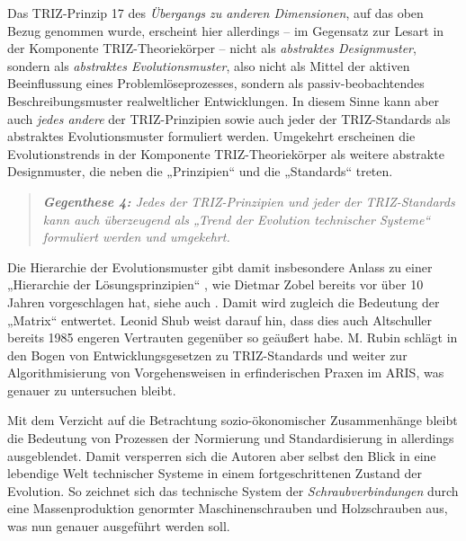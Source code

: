 \documentclass[11pt,a4paper]{article}
\begin{document}
Das TRIZ-Prinzip 17 des \emph{Übergangs zu anderen Dimensionen}, auf das oben
Bezug genommen wurde, erscheint hier allerdings -- im Gegensatz zur Lesart in
der Komponente TRIZ-Theoriekörper -- nicht als \emph{abstraktes Designmuster},
sondern als \emph{abstraktes Evolutionsmuster}, also nicht als Mittel der
aktiven Beeinflussung eines Problemlöseprozesses, sondern als
passiv-beobachtendes Beschreibungsmuster realweltlicher Entwicklungen.  In
diesem Sinne kann aber auch \emph{jedes andere} der TRIZ-Prinzipien sowie auch
jeder der TRIZ-Standards als abstraktes Evolutionsmuster formuliert
werden. Umgekehrt erscheinen die Evolutionstrends in der Komponente
TRIZ-Theoriekörper als weitere abstrakte Designmuster, die neben die
„Prinzipien“ und die „Standards“ treten.
\begin{quote}\it
  \textbf{Gegenthese 4:} Jedes der TRIZ-Prinzipien und jeder der
  TRIZ-Standards kann auch überzeugend als „Trend der Evolution technischer
  Systeme“ formuliert werden und umgekehrt. 
\end{quote}
Die Hierarchie der Evolutionsmuster gibt damit insbesondere Anlass zu einer
„Hierarchie der Lösungsprinzipien“ \cite[Kap. 3]{Zobel2016}, wie Dietmar Zobel
bereits vor über 10 Jahren vorgeschlagen hat, siehe auch \cite{Zobel2020}.
Damit wird zugleich die Bedeutung der „Matrix“ entwertet. Leonid Shub
\cite{Shub2006} weist darauf hin, dass dies auch Altschuller bereits 1985
engeren Vertrauten gegenüber so geäußert habe.  M. Rubin schlägt in
\cite{Rubin2019} den Bogen von Entwicklungsgesetzen zu TRIZ-Standards und
weiter zur Algorithmisierung von Vorgehensweisen in erfinderischen Praxen im
ARIS, was genauer zu untersuchen bleibt. 

Mit dem Verzicht auf die Betrachtung sozio-ökonomischer Zusammenhänge bleibt
die Bedeutung von Prozessen der Normierung und Standardisierung in
\cite{TESE2018} allerdings ausgeblendet. Damit versperren sich die Autoren
aber selbst den Blick in eine lebendige Welt technischer Systeme in einem
fortgeschrittenen Zustand der Evolution. So zeichnet sich das technische
System der \emph{Schraubverbindungen} durch eine Massenproduktion genormter
Maschinenschrauben und Holzschrauben aus, was nun genauer ausgeführt werden
soll.
\end{document}
